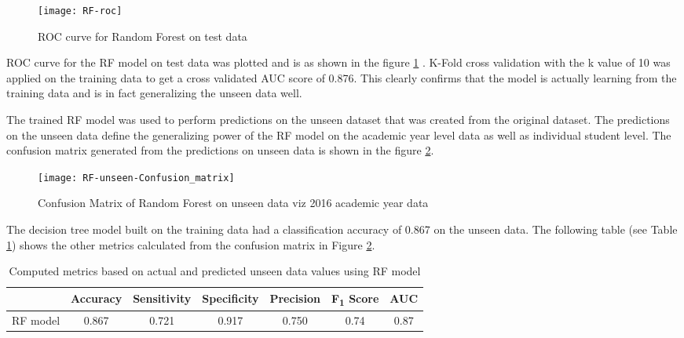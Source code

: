 \documentclass[11pt,openright]{report}
\begin{document}
{{ \begin{figure}[!htbp]
	\centering
	\texttt{[image: RF-roc]}
	\caption{ROC curve for Random Forest on test data}
	\label{fig:RF_roc}
\end{figure} 

ROC curve for the RF model on test data was plotted  and is as shown in the figure \ref{fig:RF_roc} . K-Fold cross validation with the k value of 10 was applied on the training data to get a cross validated AUC score of 0.876. This clearly confirms that the model is actually learning from the training data and is in fact generalizing the unseen data well.

The trained RF model was used to perform predictions on the unseen dataset that was created from the original dataset. The predictions on the unseen data define the generalizing power of the RF model on the academic year level data as well as individual student level. The confusion matrix generated from the predictions on unseen data is shown in the figure \ref{fig:RF_unseen_confusion_matrix}.

  \begin{figure}[!htbp]
	\centering
	\texttt{[image: RF-unseen-Confusion\_matrix]}
	\caption{Confusion Matrix of Random Forest on unseen data viz 2016 academic year data}
	\label{fig:RF_unseen_confusion_matrix}
\end{figure} 


The decision tree model built on the training data had a classification accuracy of 0.867 on the unseen data. The following table (see Table \ref{table:RF-unseen_metrics_db}) shows the other metrics calculated from the confusion matrix in Figure \ref{fig:RF_unseen_confusion_matrix}.

\begin{table}[!htbp]
	\renewcommand{\arraystretch}{1.3}
	\caption{Computed metrics based on actual and predicted unseen data values using RF model}
	\label{table:RF-unseen_metrics_db}
	\centering
	\begin{tabular}{|c|c|c|c|c|c|c|}
    \hline
  	 & \bfseries Accuracy & \bfseries Sensitivity & \bfseries Specificity & \bfseries Precision & \bfseries F\textsubscript{1} Score  & \bfseries AUC\\  
    \hline
	RF model & 0.867 & 0.721 & 0.917 & 0.750 & 0.74 & 0.87 \\ \hline
	\end{tabular} 
\end{table}



}}
\end{document}
